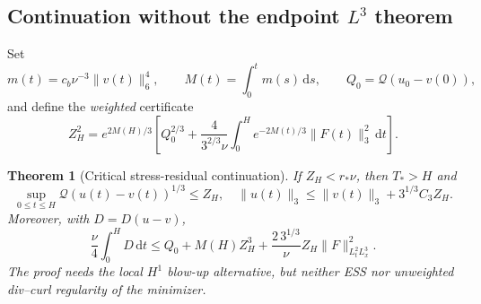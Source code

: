 \documentclass[11pt,a4paper]{article}
\newtheorem{theorem}{Theorem}[section]
\theoremstyle{definition}\newtheorem{definition}[theorem]{Definition}
\theoremstyle{remark}\newtheorem{remark}[theorem]{Remark}
\newcommand{\Q}{\mathcal Q}
\newcommand{\dd}{\,\mathrm d}
\newcommand{\norm}[1]{\lVert #1\rVert}
\newcommand{\rstar}{r_*}
\numberwithin{equation}{section}
\begin{document}
\subsection{Continuation without the endpoint \texorpdfstring{$L^3$}{L3} theorem}
Set
\begin{equation}\label{eq:M}
 m(t)=c_b\nu^{-3}\norm{v(t)}_6^4,\qquad M(t)=\int_0^tm(s)\dd s,
 \qquad Q_0=\Q(u_0-v(0)),
\end{equation}
and define the \emph{weighted} certificate
\begin{equation}\label{eq:Z}
 Z_H^2=e^{2M(H)/3}\left[Q_0^{2/3}
 +\frac4{3^{2/3}\nu}\int_0^H e^{-2M(t)/3}\norm{F(t)}_3^2\dd t\right].
\end{equation}
\begin{theorem}[Critical stress-residual continuation]\label{thm:certificate}
If $Z_H<\rstar\nu$, then $T_*>H$ and
\begin{equation}\label{eq:err}
 \sup_{0\le t\le H}\Q(u(t)-v(t))^{1/3}\le Z_H,
 \quad\norm{u(t)}_3\le\norm{v(t)}_3+3^{1/3}C_3Z_H.
\end{equation}
Moreover, with $D=D(u-v)$,
\begin{equation}\label{eq:integratedD}
 \frac\nu4\int_0^H D\dd t
 \le Q_0+M(H)Z_H^3+\frac{2\,3^{1/3}}\nu Z_H\norm F_{L^2_tL^3_x}^2.
\end{equation}
The proof needs the local $H^1$ blow-up alternative, but neither ESS nor unweighted div--curl regularity of the minimizer.
\end{theorem}
\end{document}

